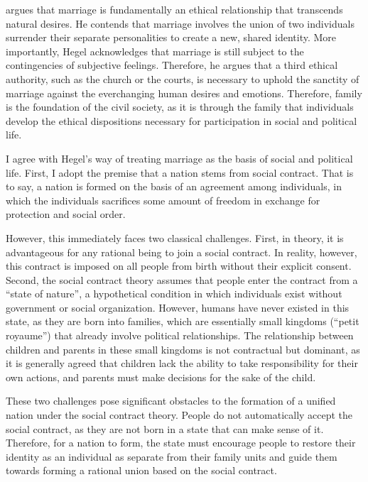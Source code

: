 \documentclass[man,floatsintext]{apa7}
\begin{document}
\textcite{hegelPhilosophyRight1821} argues that marriage is fundamentally an ethical relationship that transcends natural desires. He contends that marriage involves the union of two individuals surrender their separate personalities to create a new, shared identity. More importantly, Hegel acknowledges that marriage is still subject to the contingencies of subjective feelings. Therefore, he argues that a third ethical authority, such as the church or the courts, is necessary to uphold the sanctity of marriage against the everchanging human desires and emotions. Therefore, family is the foundation of the civil society, as it is through the family that individuals develop the ethical dispositions necessary for participation in social and political life.

I agree with Hegel's way of treating marriage as the basis of social and political life. First, I adopt the premise that a nation stems from social contract. That is to say, a nation is formed on the basis of an agreement among individuals, in which the individuals sacrifices some amount of freedom in exchange for protection and social order. 

However, this immediately faces two classical challenges. First, in theory, it is advantageous for any rational being to join a social contract. In reality, however, this contract is imposed on all people from birth without their explicit consent. Second, the social contract theory assumes that people enter the contract from a ``state of nature'', a hypothetical condition in which individuals exist without government or social organization. However, humans have never existed in this state, as they are born into families, which are essentially small kingdoms (``petit royaume'') that already involve political relationships. The relationship between children and parents in these small kingdoms is not contractual but dominant, as it is generally agreed that children lack the ability to take responsibility for their own actions, and parents must make decisions for the sake of the child.

These two challenges pose significant obstacles to the formation of a unified nation under the social contract theory. People do not automatically accept the social contract, as they are not born in a state that can make sense of it. Therefore, for a nation to form, the state must encourage people to restore their identity as an individual as separate from their family units and guide them towards forming a rational union based on the social contract. 
\end{document}
